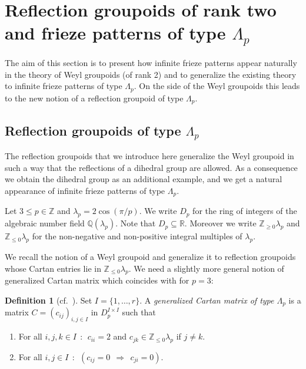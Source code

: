 \documentclass[11pt,a4paper]{amsart}
\theoremstyle{definition}
\newtheorem{Definition}[Lemma]{Definition}
\numberwithin{equation}{section}
\newcommand{\Cm }{C}
\newcommand{\cm }{c}
\newcommand{\Ri}{D_p}
\begin{document}
\section{Reflection groupoids of rank two and frieze patterns of type $\Lambda_p$}
\label{sec:groupoids}

The aim of this section is to present how 
infinite frieze patterns
appear naturally in the theory of Weyl groupoids
(of rank 2)
and to generalize the existing theory
to infinite frieze patterns of type $\Lambda_p$. 
On the side of the Weyl groupoids this leads to 
the new notion of a reflection groupoid of
type $\Lambda_p$. 


\subsection{Reflection groupoids of type $\Lambda_p$}
The reflection groupoids that we introduce here generalize the Weyl groupoid in such a way that the reflections of a dihedral group are allowed. As a consequence we obtain the dihedral group as an additional example, and we get a natural appearance of infinite frieze patterns of type $\Lambda_p$.

Let $3\le p\in\mathbb{Z}$ and $\lambda_p=2\cos(\pi/p)$.
We write $\Ri$ for the ring of integers of 
 the algebraic number field $\mathbb{Q}(\lambda_p)$. Note that $\Ri\subseteq \mathbb{R}$. Moreover we write
$\mathbb{Z}_{\ge 0} \lambda_p$ and
$\mathbb{Z}_{\le 0} \lambda_p$
for the 
non-negative and non-positive
integral
multiples of $\lambda_p$.


We recall the notion of a Weyl groupoid \cite{p-CH09a} and generalize it to reflection groupoids whose Cartan entries lie in 
$\mathbb{Z}_{\le 0}\lambda_p$.
We need a slightly more general notion of generalized Cartan matrix which coincides with \cite[Section 1.1]{b-Kac90} for $p=3$:

\begin{Definition}[cf.\ {\cite[Section 1.1]{b-Kac90}}]
\label{def:genCartan}
Set $I=\{1,\ldots,r\}$. A \emph{generalized Cartan matrix of type $\Lambda_p$}
is a matrix $\Cm =(\cm _{ij})_{i,j\in I}$
in $\Ri^{I\times I}$ such that
\begin{enumerate}
\item[(M1)] For all $i,j,k\in I\:\: :\:\: \cm _{ii}=2$ and $\cm _{jk}\in 
\mathbb{Z}_{\le 0}\lambda_p$ if $j\not=k$.
\item[(M2)] For all $i,j\in I\:\::\:\: (\cm _{ij}=0 \:\:\Rightarrow\:\: \cm _{ji}=0)$.
\end{enumerate}
\end{Definition}
\end{document}
